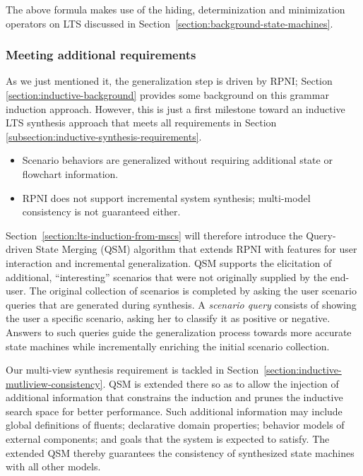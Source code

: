 The above formula makes use of the hiding, determinization and minimization operators on LTS discussed in Section~\ref{section:background-state-machines}.

\subsubsection*{Meeting additional requirements}

As we just mentioned it, the generalization step is driven by RPNI; Section \ref{section:inductive-background} provides some background on this grammar induction approach. However, this is just a first milestone toward an inductive LTS synthesis approach that meets all requirements in Section \ref{subsection:inductive-synthesis-requirements}. 
\begin{itemize}
\item Scenario behaviors are generalized without requiring additional state or flowchart information. 
\item RPNI does not support incremental system synthesis; multi-model consistency is not guaranteed either. 
\end{itemize}

Section~\ref{section:lts-induction-from-mscs} will therefore introduce the Query-driven State Merging (QSM) algorithm that extends RPNI with features for user interaction and incremental generalization. QSM supports the elicitation of additional, ``interesting'' scenarios that were not originally supplied by the end-user. The original collection of scenarios is completed by asking the user scenario queries that are generated during synthesis. A \emph{scenario query} consists of showing the user a specific scenario, asking her to classify it as positive or negative. Answers to such queries guide the generalization process towards more accurate state machines while incrementally enriching the initial scenario collection.

Our multi-view synthesis requirement is tackled in Section~\ref{section:inductive-mutliview-consistency}. QSM is extended there so as to allow the injection of additional information that constrains the induction and prunes the inductive search space for better performance. Such additional information may include global definitions of fluents; declarative domain properties; behavior models of external components; and goals that the system is expected to satisfy. The extended QSM thereby guarantees the consistency of synthesized state machines with all other models.

